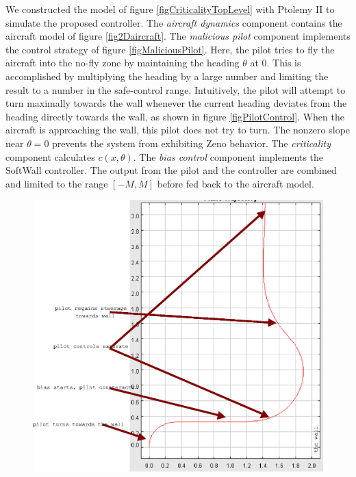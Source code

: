 \documentclass[11pt]{article}
\begin{document}
We constructed the model of figure \ref{figCriticalityTopLevel} with
Ptolemy II to simulate the proposed controller. The \emph{aircraft
dynamics} component contains the aircraft model of figure
\ref{fig2Daircraft}. The \emph{malicious pilot} component implements
the control strategy of figure \ref{figMaliciousPilot}. Here, the
pilot tries to fly the aircraft into the no-fly zone by maintaining
the heading $\theta$ at 0. This is accomplished by multiplying the
heading by a large number and limiting the result to a number in the
safe-control range.  Intuitively, the pilot will attempt to turn
maximally towards the wall whenever the current heading deviates from
the heading directly towards the wall, as shown in figure
\ref{figPilotControl}.  When the aircraft is approaching the wall, this
pilot does not try to turn.  The nonzero slope near $\theta = 0$
prevents the system from exhibiting Zeno behavior.  The
\emph{criticality} component calculates $c(x, \theta)$. The \emph{bias
control} component implements the SoftWall controller. The output
from the pilot and the controller are combined and limited to the
range $[-M, M]$ before fed back to the aircraft model.

\begin{figure}[btp]
\centering
\includegraphics[width=5in]{simulationRun.eps}
\end{figure}
\end{document}
